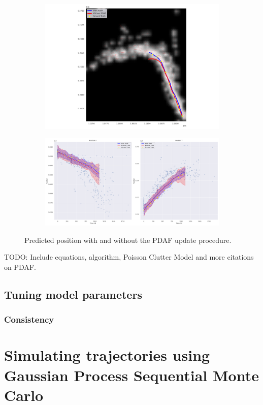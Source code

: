\begin{figure}
    \begin{subfigure}{\textwidth}
    \includegraphics[width=\textwidth]{figures/dyngp/gp_ekf_with_pdaf.png}
    \end{subfigure}
    \begin{subfigure}{\textwidth}
    \includegraphics[width=\textwidth]{figures/dyngp/gp_ekf_unc_with_pdaf.png}
    \end{subfigure}
    \caption{Predicted position with and without the PDAF update procedure.}
\end{figure}

TODO: Include equations, algorithm, Poisson Clutter Model and more citations on PDAF. 

\subsection{Tuning model parameters}
\subsubsection{Consistency}


\section{Simulating trajectories using Gaussian Process Sequential Monte Carlo}